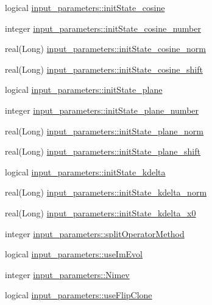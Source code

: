 \begin{DoxyCompactItemize}
\item 
logical \hyperlink{namespaceinput__parameters_a794b8486b7ecd6258448887bce533681}{input\_\-parameters::initState\_\-cosine}
\item 
integer \hyperlink{namespaceinput__parameters_ad5ff3d9c110be99ed08bbe970f1630c8}{input\_\-parameters::initState\_\-cosine\_\-number}
\item 
real(Long) \hyperlink{namespaceinput__parameters_a51d2cc916f531fadef1a6f0729644174}{input\_\-parameters::initState\_\-cosine\_\-norm}
\item 
real(Long) \hyperlink{namespaceinput__parameters_ac3a5530df841dc82b4819f34f1e44980}{input\_\-parameters::initState\_\-cosine\_\-shift}
\item 
logical \hyperlink{namespaceinput__parameters_a727a13be305b5dde7955fd2d02f955e4}{input\_\-parameters::initState\_\-plane}
\item 
integer \hyperlink{namespaceinput__parameters_a876ac6edc93b733aeb66f54aca167741}{input\_\-parameters::initState\_\-plane\_\-number}
\item 
real(Long) \hyperlink{namespaceinput__parameters_a22ba3f1343580a0db34433e32279e365}{input\_\-parameters::initState\_\-plane\_\-norm}
\item 
real(Long) \hyperlink{namespaceinput__parameters_a97253a3c66d919b8a99dd33c633d3bd8}{input\_\-parameters::initState\_\-plane\_\-shift}
\item 
logical \hyperlink{namespaceinput__parameters_aae45dd03716b9ad9a0600a9d9a798935}{input\_\-parameters::initState\_\-kdelta}
\item 
real(Long) \hyperlink{namespaceinput__parameters_a1b2e5c088ab1d39d896586d7fb18b142}{input\_\-parameters::initState\_\-kdelta\_\-norm}
\item 
real(Long) \hyperlink{namespaceinput__parameters_a65eb9165c6a1fd054daefc2a96e7ae2a}{input\_\-parameters::initState\_\-kdelta\_\-x0}
\item 
integer \hyperlink{namespaceinput__parameters_a127f71f45eade1f05ced1535e88c771d}{input\_\-parameters::splitOperatorMethod}
\item 
logical \hyperlink{namespaceinput__parameters_a9672a1c90e65a2ecee350dd2dae64e03}{input\_\-parameters::useImEvol}
\item 
integer \hyperlink{namespaceinput__parameters_ac0212885e38ab22a77411b20bec16420}{input\_\-parameters::Nimev}
\item 
logical \hyperlink{namespaceinput__parameters_a504b6e2c93e4a4af47125d83d6e5d75d}{input\_\-parameters::useFlipClone}

\end{DoxyCompactItemize}
